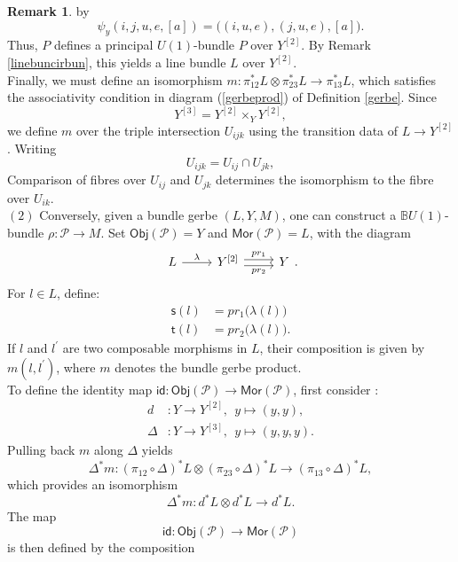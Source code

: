 \documentclass{article}
\theoremstyle{plain}
\theoremstyle{definition}
\newtheorem{rem}[thm]{Remark}
\begin{document}
\begin{rem}
by
$$\psi_y(i,j,u,e,[a]) = \bigl((i,u,e),(j,u,e),[a]\bigr).$$
Thus, $P$ defines a principal $U(1)$-bundle $P$ over $Y^{[2]}$. By Remark \ref{linebuncirbun}, this yields a line bundle $L$ over $Y^{[2]}$. \\
Finally, we must define an isomorphism $m:\pi_{12}^*L \otimes \pi_{23}^*L \longrightarrow \pi_{13}^*L$, which satisfies the associativity condition in diagram (\ref{gerbeprod}) of Definition \ref{gerbe}. Since
\[
Y^{[3]} = Y^{[2]} \times_Y Y^{[2]},
\]
we define $m$ over the triple intersection $U_{ijk}$ using the transition data of $L \longrightarrow Y^{[2]}$. Writing
\[
U_{ijk} = U_{ij} \cap U_{jk},
\]
Comparison of fibres over $U_{ij}$ and $U_{jk}$ determines the isomorphism to the fibre over $U_{ik}$. \\
$(2)$ Conversely, given a bundle gerbe $(L,Y,M)$, one can construct a $\mathbb{B}U(1)$-bundle $\rho:\mathcal{P} \longrightarrow M$. Set $\mathsf{Obj}(\mathcal{P}) = Y$ and $\mathsf{Mor}(\mathcal{P}) = L$, with the diagram
\[
\begin{tikzcd}
L \arrow[r,"\lambda"] & Y^{[2]} \arrow[r,shift left,"pr_1"] \arrow[r,shift right,"pr_2"'] & Y
\end{tikzcd}.
\]
For $l \in L$, define:
\begin{align*}
\mathsf{s}(l) & = pr_1\bigl(\lambda(l)\bigr) \\
\mathsf{t}(l) & = pr_2\bigl(\lambda(l)\bigr).
\end{align*}
If $l$ and $l^\prime$ are two composable morphisms in $L$, their composition is given by $m(l,l^\prime)$, where $m$ denotes the bundle gerbe product. \\
To define the identity map $\mathsf{id}:\mathsf{Obj}(\mathcal{P}) \longrightarrow \mathsf{Mor}(\mathcal{P})$, first consider :
\begin{align*}
d & : Y \longrightarrow Y^{[2]}, ~~ y \mapsto (y,y), \\
\Delta & : Y \longrightarrow Y^{[3]}, ~~ y \mapsto (y,y,y).
\end{align*}
Pulling back $m$ along $\Delta$ yields
\[
\Delta^*m:(\pi_{12} \circ \Delta)^*L \otimes (\pi_{23} \circ \Delta)^*L \longrightarrow (\pi_{13} \circ \Delta)^*L,
\]
which provides an isomorphism
\begin{equation}
\Delta^*m:d^*L \otimes d^*L \longrightarrow d^*L.
\end{equation}
The map 
$$\mathsf{id}:\mathsf{Obj}(\mathcal{P}) \longrightarrow \mathsf{Mor}(\mathcal{P})$$
is then defined by the composition
\[
\begin{tikzcd}

\end{tikzcd}\]
\end{rem}
\end{document}
